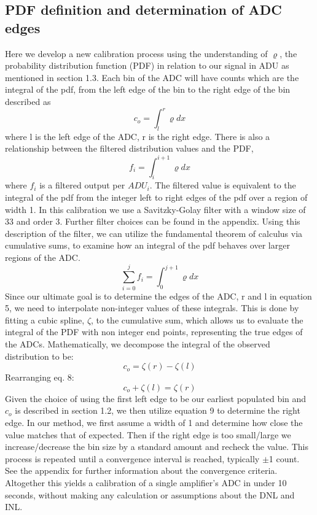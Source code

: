 \documentclass[11pt, letterpaper]{article}
\begin{document}
\subsection{PDF definition and determination of ADC edges} 	
\label{sec:PDFEdges}
\indent

Here we develop a new calibration process using the understanding of $\varrho$, the probability distribution function (PDF) in relation to our signal in ADU as mentioned in section 1.3. 
Each bin of the ADC will have counts which are the integral of the pdf, from the left edge of the bin to the right edge of the bin described as
 \begin{equation}
c_o =  \int_{l}^{r} \varrho dx
\end{equation}
where l is the left edge of the ADC, r is the right edge. 
There is also a relationship between the filtered distribution values and the PDF,
 \begin{equation}
f_i =  \int_{i}^{i+1} \varrho dx
\end{equation}
where $f_{i}$ is a filtered output per $ADU_{i}$. 
The filtered value is equivalent to the integral of the pdf from the integer left to right edges of the pdf over a region of width 1. 
In this calibration we use a Savitzky-Golay filter with a window size of 33 and order 3. 
Further filter choices can be found in the appendix. 
Using this description of the filter, we can utilize the fundamental theorem of calculus via cumulative sums, to examine how an integral of the pdf behaves over larger regions of the ADC. 
 \begin{equation}
\sum_{i=0}^{j} f_i= \int_{0}^{j+1} \varrho dx
\end{equation}
Since our ultimate goal is to determine the edges of the ADC, r and l in equation 5, we need to interpolate non-integer values of these integrals. 
This is done by fitting a cubic spline, $ \zeta$, to the cumulative sum, which allows us to evaluate the integral of the PDF with non integer end points, representing the true edges of the ADCs. 
Mathematically, we decompose the integral of the observed distribution to be:
 \begin{equation}
c_o = \zeta(r) - \zeta(l)
\end{equation}
Rearranging eq. 8: 
 \begin{equation}
c_o + \zeta(l) = \zeta(r)
\end{equation}
Given the choice of using the first left edge to be our earliest populated bin and $c_{o}$ is described in section 1.2, we then utilize equation 9 to determine the right edge.
In our method, we first assume a width of 1 and determine how close the value matches that of expected. Then if the right edge is too small/large we increase/decrease the bin size by a standard amount and recheck the value. 
This process is repeated until a convergence interval is reached, typically $\pm$1 count. 
See the appendix for further information about the convergence criteria. 
Altogether this yields a calibration of a single amplifier's ADC in under 10 seconds, without making any calculation or assumptions about the DNL and INL.
\end{document}
